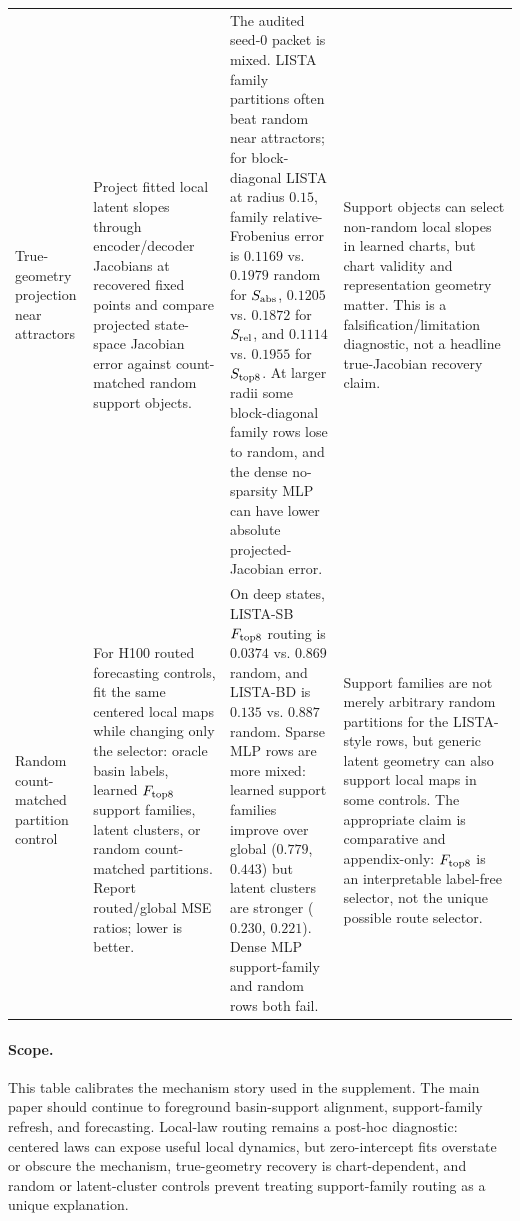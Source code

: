 \begin{table}[tbp]
{\begin{tabular}{@{}p{}p{}p{}p{}@{}}
\\
\addlinespace
True-geometry projection near attractors
&
Project fitted local latent slopes through encoder/decoder Jacobians at recovered fixed points and compare projected state-space Jacobian error against count-matched random support objects.
&
The audited seed-\(0\) packet is mixed. LISTA family partitions often beat random near attractors; for block-diagonal LISTA at radius \(0.15\), family relative-Frobenius error is \(0.1169\) vs. \(0.1979\) random for \(S_{\rm abs}\), \(0.1205\) vs. \(0.1872\) for \(S_{\rm rel}\), and \(0.1114\) vs. \(0.1955\) for \(S_{\rm top8}\). At larger radii some block-diagonal family rows lose to random, and the dense no-sparsity MLP can have lower absolute projected-Jacobian error.
&
Support objects can select non-random local slopes in learned charts, but chart validity and representation geometry matter. This is a falsification/limitation diagnostic, not a headline true-Jacobian recovery claim.
\\
\addlinespace
Random count-matched partition control
&
For H100 routed forecasting controls, fit the same centered local maps while changing only the selector: oracle basin labels, learned \(F_{\rm top8}\) support families, latent clusters, or random count-matched partitions. Report routed/global MSE ratios; lower is better.
&
On deep states, LISTA-SB \(F_{\rm top8}\) routing is \(0.0374\) vs. \(0.869\) random, and LISTA-BD is \(0.135\) vs. \(0.887\) random. Sparse MLP rows are more mixed: learned support families improve over global (\(0.779\), \(0.443\)) but latent clusters are stronger (\(0.230\), \(0.221\)). Dense MLP support-family and random rows both fail.
&
Support families are not merely arbitrary random partitions for the LISTA-style rows, but generic latent geometry can also support local maps in some controls. The appropriate claim is comparative and appendix-only: \(F_{\rm top8}\) is an interpretable label-free selector, not the unique possible route selector.
\\
\bottomrule
\end{tabular}}
\end{table}

\paragraph{Scope.}
This table calibrates the mechanism story used in the supplement. The main paper should continue to foreground basin-support alignment, support-family refresh, and forecasting. Local-law routing remains a post-hoc diagnostic: centered laws can expose useful local dynamics, but zero-intercept fits overstate or obscure the mechanism, true-geometry recovery is chart-dependent, and random or latent-cluster controls prevent treating support-family routing as a unique explanation.
